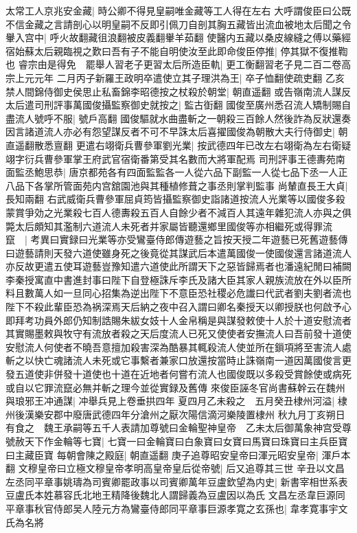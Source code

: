 太常工人京兆安金藏|{
	時公卿不得見皇嗣唯金藏等工人得在左右}
大呼謂俊臣曰公既不信金藏之言請剖心以明皇嗣不反即引佩刀自剖其胸五藏皆出流血被地太后聞之令轝入宫中|{
	呼火故翻藏徂浪翻被皮義翻轝羊茹翻}
使醫内五藏以桑皮線縫之傅以藥經宿始蘇太后親臨視之歎曰吾有子不能自明使汝至此即命俊臣停推|{
	停其獄不復推鞫也}
睿宗由是得免　罷舉人習老子更習太后所造臣軌|{
	更工衡翻習老子見二百二卷高宗上元元年}
二月丙子新羅王政明卒遣使立其子理洪為王|{
	卒子恤翻使疏吏翻}
乙亥禁人間錦侍御史侯思止私畜錦李昭德按之杖殺於朝堂|{
	朝直遥翻}
或告嶺南流人謀反太后遣司刑評事萬國俊攝監察御史就按之|{
	監古衘翻}
國俊至廣州悉召流人矯制賜自盡流人號呼不服|{
	號戶高翻}
國俊驅就水曲盡斬之一朝殺三百餘人然後詐為反狀還奏因言諸道流人亦必有怨望謀反者不可不早誅太后喜擢國俊為朝散大夫行侍御史|{
	朝直遥翻散悉亶翻}
更遣右翊衛兵曹參軍劉光業|{
	按武德四年已改左右翊衛為左右衛疑翊字衍兵曹參軍掌王府武官宿衛番第受其名數而大將軍配焉}
司刑評事王德夀苑南面監丞鮑思恭|{
	唐京都苑各有四面監監各一人從六品下副監一人從七品下丞一人正八品下各掌所管面苑内宫舘園池與其種植修葺之事丞則掌判監事}
尚輦直長王大貞|{
	長知兩翻}
右武威衛兵曹參軍屈貞筠皆攝監察御史詣諸道按流人光業等以國俊多殺蒙賞爭効之光業殺七百人德夀殺五百人自餘少者不減百人其遠年雜犯流人亦與之俱斃太后頗知其濫制六道流人未死者并家屬皆聽還鄉里國俊等亦相繼死或得罪流竄　|{
	考異曰實録曰光業等亦受鸞臺侍郎傳遊藝之旨按天授二年遊藝已死舊遊藝傳曰遊藝請則天發六道使雖身死之後竟從其謀武后本遣萬國俊一使國俊還言諸道流人亦反故更遣五使耳遊藝豈豫知遣六道使此所謂天下之惡皆歸焉者也潘遠紀閒曰補闕李秦授寓直中書進封事曰陛下自登極誅斥李氏及諸大臣其家人親族流放在外以臣所料且數萬人如一旦同心招集為逆出陛下不意臣恐社稷必危䜟曰代武者劉夫劉者流也陛下不殺此輩臣恐為祸深焉天后納之夜中召入謂曰卿名秦授天以卿授朕也何啟予心即拜考功員外郎仍知制誥賜朱紱女妓十人金帛稱是與謀發敕使十人於十道安慰流者其實賜墨敕與牧守有流放者殺之天后度流人已死又使使者安撫流人曰吾前發十道使安慰流人何使者不曉吾意擅加殺害深為酷暴其輒殺流人使並所在鎻項將至害流人處斬之以快亡魂諸流人未死或它事繫者兼家口放還按當時止誅嶺南一道因萬國俊言更發五道使非併發十道使也十道在近地者何嘗冇流人也國俊既以多殺受賞餘使或病死或自以它罪流竄必無并斬之理今並從實録及舊傳}
來俊臣誣冬官尚書蘇幹云在魏州與琅邪王冲通謀|{
	冲舉兵見上卷垂拱四年}
夏四月乙未殺之　五月癸丑棣州河溢|{
	棣州後漢樂安郡中廢唐武德四年分滄州之厭次陽信滴河樂陵置棣州}
秋九月丁亥朔日有食之　魏王承嗣等五千人表請加尊號曰金輪聖神皇帝　乙未太后御萬象神宫受尊號赦天下作金輪等七寶|{
	七寶一曰金輪寶曰白象寶曰女寶曰馬寶曰珠寶曰主兵臣寶曰主藏臣寶}
每朝會陳之殿庭|{
	朝直遥翻}
庚子追尊昭安皇帝曰渾元昭安皇帝|{
	渾戶本翻}
文穆皇帝曰立極文穆皇帝孝明高皇帝皇后從帝號|{
	后又追尊其三世}
辛丑以文昌左丞同平章事姚璹為司賓卿罷政事以司賓卿萬年豆盧欽望為内史|{
	新書宰相世系表豆盧氏本姓慕容氏北地王精降後魏北人謂歸義為豆盧因以為氏}
文昌左丞韋巨源同平章事秋官侍郎吴人陸元方為鸞臺侍郎同平章事巨源孝寛之玄孫也|{
	韋孝寛事宇文氏為名將}


